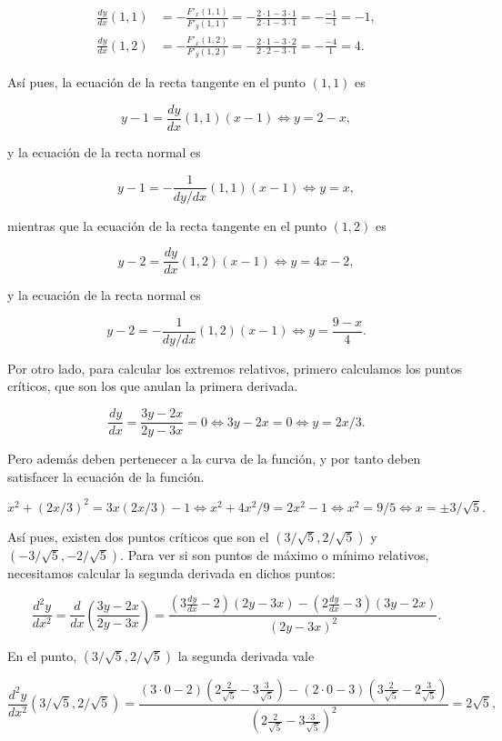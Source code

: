 \documentclass[
  spanish,
  a4paper,
]{scrreport}
\theoremstyle{definition}
\theoremstyle{remark}
\begin{document}
\begin{tcolorbox}
\begin{align*}
\frac{dy}{dx}(1,1) 
&= -\frac{F'_x(1,1)}{F'_y(1,1)} 
= -\frac{2\cdot 1-3\cdot 1}{2\cdot 1-3\cdot 1} 
= -\frac{-1}{-1} 
= -1,\\
\frac{dy}{dx}(1,2) 
&= -\frac{F'_x(1,2)}{F'_y(1,2)} 
= -\frac{2\cdot 1-3\cdot 2}{2\cdot 2-3\cdot 1} 
= -\frac{-4}{1} 
= 4.
\end{align*}

Así pues, la ecuación de la recta tangente en el punto \((1,1)\) es

\[
y-1 = \frac{dy}{dx}(1,1)(x-1) \Leftrightarrow y= 2-x,
\]

y la ecuación de la recta normal es

\[
y-1 = -\frac{1}{dy/dx}(1,1)(x-1) \Leftrightarrow y= x,
\]

mientras que la ecuación de la recta tangente en el punto \((1,2)\) es

\[
y-2 = \frac{dy}{dx}(1,2)(x-1) \Leftrightarrow y= 4x-2,
\]

y la ecuación de la recta normal es

\[
y-2 = -\frac{1}{dy/dx}(1,2)(x-1) \Leftrightarrow y=\frac{9-x}{4}.
\]

Por otro lado, para calcular los extremos relativos, primero calculamos
los puntos críticos, que son los que anulan la primera derivada.

\[
\frac{dy}{dx}=\frac{3y-2x}{2y-3x}=0 \Leftrightarrow 3y-2x=0 \Leftrightarrow y=2x/3.
\]

Pero además deben pertenecer a la curva de la función, y por tanto deben
satisfacer la ecuación de la función.

\[
x^{2}+(2x/3)^{2}=3x(2x/3)-1 \Leftrightarrow x^{2}+4x^{2}/9 = 2x^{2}-1 \Leftrightarrow x^{2}=9/5 \Leftrightarrow x=\pm 3/\sqrt{5}.
\]

Así pues, existen dos puntos críticos que son el
\((3/\sqrt{5},2/\sqrt{5})\) y \((-3/\sqrt{5},-2/\sqrt{5})\). Para ver si
son puntos de máximo o mínimo relativos, necesitamos calcular la segunda
derivada en dichos puntos:

\[
\frac{d^{2}y}{dx^{2}} = \frac{d}{dx}\left(\frac{3y-2x}{2y-3x}\right) = \frac{(3\frac{dy}{dx}-2)(2y-3x)-(2\frac{dy}{dx}-3)(3y-2x)}{(2y-3x)^{2}}.
\]

En el punto, \((3/\sqrt{5},2/\sqrt{5})\) la segunda derivada vale

\[
\frac{d^{2}y}{dx^{2}}(3/\sqrt{5},2/\sqrt{5})=
\frac{(3\cdot 0-2)(2\frac{2}{\sqrt{5}}-3\frac{3}{\sqrt{5}})-(2\cdot 0-3)(3\frac{2}{\sqrt{5}}-2\frac{3}{\sqrt{5}})}{(2\frac{2}{\sqrt{5}}-3\frac{3}{\sqrt{5}})^{2}} = 2\sqrt{5},
\]


\end{tcolorbox}
\end{document}
